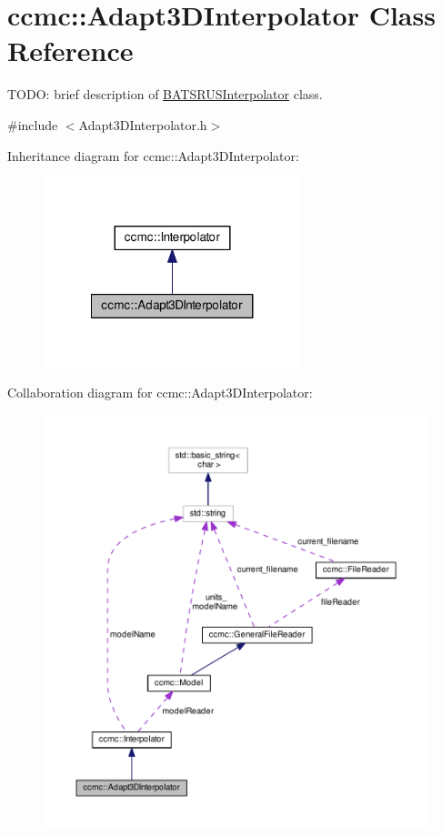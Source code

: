 \hypertarget{classccmc_1_1_adapt3_d_interpolator}{\section{ccmc\-:\-:Adapt3\-D\-Interpolator Class Reference}
\label{classccmc_1_1_adapt3_d_interpolator}
}


T\-O\-D\-O\-: brief description of \hyperlink{classccmc_1_1_b_a_t_s_r_u_s_interpolator}{B\-A\-T\-S\-R\-U\-S\-Interpolator} class.  




{\ttfamily \#include $<$Adapt3\-D\-Interpolator.\-h$>$}



Inheritance diagram for ccmc\-:\-:Adapt3\-D\-Interpolator\-:
\nopagebreak
\begin{figure}[H]
\begin{center}
\leavevmode
\includegraphics[width=212pt]{classccmc_1_1_adapt3_d_interpolator__inherit__graph}
\end{center}
\end{figure}


Collaboration diagram for ccmc\-:\-:Adapt3\-D\-Interpolator\-:
\nopagebreak
\begin{figure}[H]
\begin{center}
\leavevmode
\includegraphics[width=350pt]{classccmc_1_1_adapt3_d_interpolator__coll__graph}
\end{center}
\end{figure}
